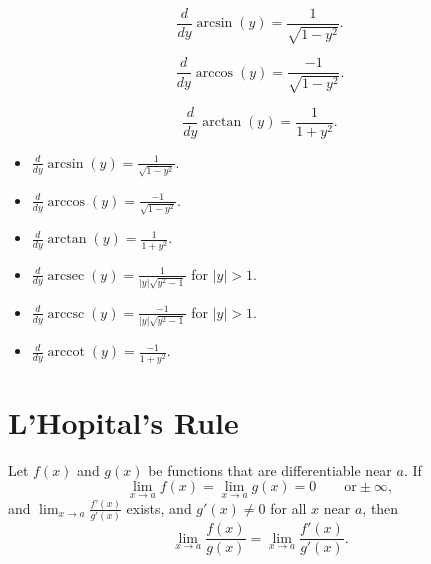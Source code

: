 \documentclass{ximera}
\newcommand{\dd}[2][]{\frac{d #1}{d #2}}
\DeclareMathOperator{\arccot}{arccot}
\DeclareMathOperator{\arcsec}{arcsec}
\DeclareMathOperator{\arccsc}{arccsc}
\begin{document}
\begin{theorem}
\[
\dd{y} \arcsin(y) = \frac{1}{\sqrt{1-y^2}}.
\]
\end{theorem}



\begin{theorem}
\[
\dd{y} \arccos(y) = \frac{-1}{\sqrt{1-y^2}}.
\]
\end{theorem}



\begin{theorem}
\[
\dd{y} \arctan(y) = \frac{1}{1+y^2}.
\]
\end{theorem}



\begin{theorem} \hfil
\begin{itemize}
\item $\dd{y} \arcsin(y) = \frac{1}{\sqrt{1-y^2}}$.
\item $\dd{y} \arccos(y) = \frac{-1}{\sqrt{1-y^2}}$.
\item $\dd{y} \arctan(y) = \frac{1}{1+y^2}$.
\item $\dd{y} \arcsec(y) = \frac{1}{|y|\sqrt{y^2-1}}$ for $|y|>1$.
\item $\dd{y} \arccsc(y) = \frac{-1}{|y|\sqrt{y^2-1}}$ for $|y|>1$.
\item $\dd{y} \arccot(y) = \frac{-1}{1+y^2}$.
\end{itemize}
\end{theorem}







\section{L'Hopital's Rule}





\begin{theorem}
Let $f(x)$ and $g(x)$ be functions that are differentiable near $a$. If
\[
\lim_{x \to a} f(x) = \lim_{x \to a}g(x) = 0 \qquad \text{or} \pm \infty,
\]
and $\lim_{x \to a} \frac{f'(x)}{g'(x)}$ exists, and $g'(x) \neq 0$
for all $x$ near $a$, then
\[
\lim_{x \to a} \frac{f(x)}{g(x)} = \lim_{x \to a} \frac{f'(x)}{g'(x)}.
\]
\end{theorem}
\end{document}
